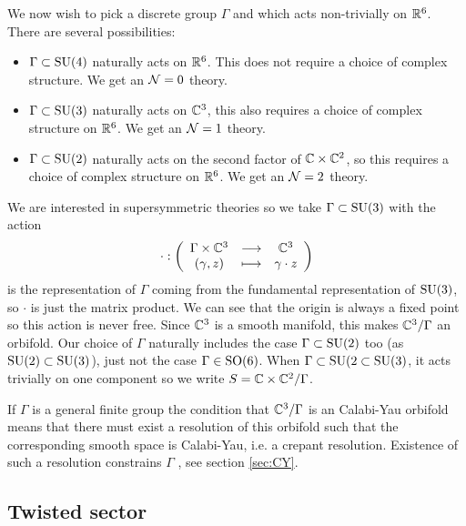         We now wish to pick a discrete group $\Gamma$ and which acts non-trivially on $\mathbb{R}^6$. There are several possibilities:
        \begin{itemize}
            \item $\Gamma\subset\text{SU}(4)$ naturally acts on $\mathbb{R}^6$. This does not require a choice of complex structure. We get an $\mathcal{N}=0$ theory.
            \item $\Gamma\subset\text{SU}(3)$ naturally acts on $\mathbb{C}^3$, this also requires a choice of complex structure on $\mathbb{R}^6$. We get an $\mathcal{N}=1$ theory.
            \item $\Gamma\subset\text{SU}(2)$ naturally acts on the second factor of $\mathbb{C}\times\mathbb{C}^2$, so this requires a choice of complex structure on $\mathbb{R}^6$. We get an $\mathcal{N}=2$ theory.
        \end{itemize}

        We are interested in supersymmetric theories so we take $\Gamma\subset\text{SU}(3)$ with the action
        \begin{equation}
            \cdot:\left(
            \begin{array}{ccc}
                \Gamma\times\mathbb{C}^3 & \longrightarrow & \mathbb{C}^3 \\
                (\gamma,z) & \longmapsto & \gamma\cdot z
            \end{array}
            \right)
        \end{equation}
        is the representation of $\Gamma$ coming from the fundamental representation of $\text{SU}(3)$, so $\cdot$ is just the matrix product. We can see that the origin is always a fixed point so this action is never free. Since $\mathbb{C}^3$ is a smooth manifold, this makes $\mathbb{C}^3/\Gamma$ an orbifold. Our choice of $\Gamma$ naturally includes the case $\Gamma\subset\text{SU}(2)$ too (as $\text{SU}(2)\subset\text{SU}(3)$), just not the case $\Gamma\in\text{SO}(6)$. When $\Gamma\subset\text{SU}(2\subset\text{SU}(3)$, it acts trivially on one component so we write $S=\mathbb{C}\times\mathbb{C}^2/\Gamma$.

        If $\Gamma$ is a general finite group the condition that $\mathbb{C}^3/\Gamma$ is an Calabi-Yau orbifold means that there must exist a resolution of this orbifold such that the corresponding smooth space is Calabi-Yau, i.e. a crepant resolution. Existence of such a resolution constrains $\Gamma$ , see section \ref{sec:CY}.

    
    \subsection{Twisted sector}

